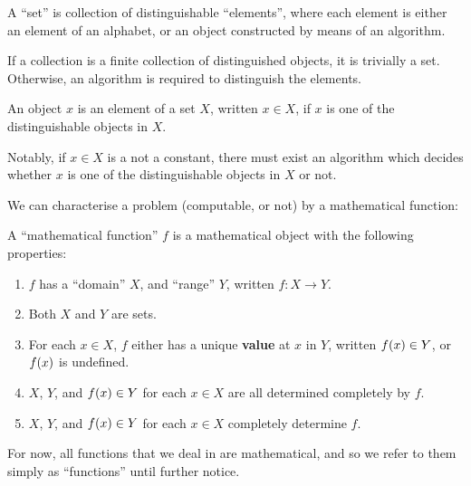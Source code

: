 \pagebreak

\begin{notion}

A ``set'' is collection of distinguishable ``elements'', where each element is
either an element of an alphabet, or an object constructed by means of an algorithm. 

If a collection is a finite collection of distinguished objects, it is
trivially a set. Otherwise, an algorithm is required to distinguish the
elements.

\end{notion}

\begin{notion} An object $x$ is an element of a set $X$, written $x\in X$, if
$x$ is one of the distinguishable objects in $X$. \end{notion}

Notably, if $x\in X$ is a not a constant, there must exist an algorithm which
decides whether $x$ is one of the distinguishable objects in $X$ or not.

We can characterise a problem (computable, or not) by a mathematical function:

\begin{notion}

A ``mathematical function'' $f$ is a mathematical object with the following
properties:

\begin{enumerate}

\item $f$ has a ``domain'' $X$, and ``range'' $Y$, written $f:X\rightarrow Y$.

\item Both $X$ and $Y$ are sets.

\item For each $x \in X$, $f$ either has a unique \textbf{value} at $x$ in $Y$,
written $f\mathopen{}\left({x}\right)\mathclose{} \in Y$, or $f\mathopen{}\left({x}\right)\mathclose{}$ is undefined.

\item $X$, $Y$, and $f\mathopen{}\left({x}\right)\mathclose{}\in Y$ for each $x\in X$ are all determined
completely by $f$.

\item $X$, $Y$, and $f\mathopen{}\left({x}\right)\mathclose{}\in Y$ for each $x\in X$ completely determine $f$.

\end{enumerate}

\end{notion}

For now, all functions that we deal in are mathematical, and so we refer to
them simply as ``functions'' until further notice.

